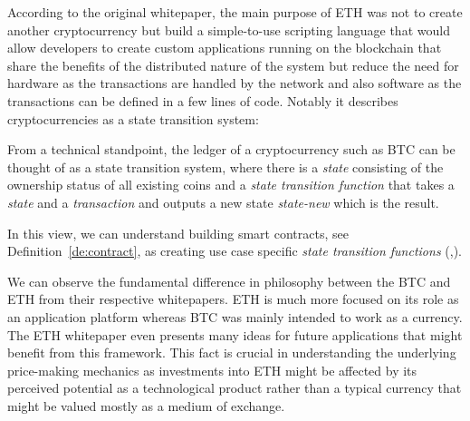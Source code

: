 According to the original whitepaper, the main purpose of \ac{ETH} was not to
create another cryptocurrency but build a simple-to-use scripting language
that would allow developers to create custom applications running on the blockchain 
that share the benefits of the distributed nature of the system but reduce the 
need for hardware as the transactions are handled by the network and also software
as the transactions can be defined in a few lines of code. Notably it 
describes cryptocurrencies as a state transition system:

\begin{defin}\label{de:ledger}
    From a technical standpoint, the ledger of a cryptocurrency such as \ac{BTC}
    can be thought of as a state transition system, where there is a 
    \textit{state}
    consisting of the ownership status of all existing coins and a 
    \textit{state transition function} that takes a \textit{state} and a 
    \textit{transaction}
    and outputs a new state \textit{state-new} which is the result.
\end{defin}

In this view, we can understand building smart contracts, see Definition~\ref{de:contract}, 
as creating use case specific \textit{state transition functions} 
(\cite[see Chapter Bitcoin As A State Transition System]{buterin2013ethereum},\cite[see Chapter 2]{Tikhomirov2018}). 

We can observe the fundamental difference in 
philosophy between the \ac{BTC} and \ac{ETH} from their respective 
whitepapers. \ac{ETH} is much 
more focused on its role as an application platform whereas \ac{BTC} was mainly 
intended to work as a currency. The \ac{ETH} whitepaper even
presents many ideas for future applications that might benefit from this framework.
This fact is crucial in understanding the 
underlying price-making mechanics as investments into \ac{ETH} might be 
affected by its perceived potential as a technological product rather than 
a typical currency that might be valued mostly as a medium of exchange. 


